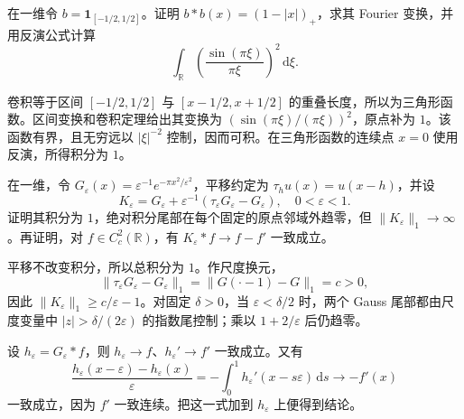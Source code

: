 \begin{exercise}\label{b2:ex:03-tent}
在一维令 \(b=\mathbf1_{[-1/2,1/2]}\)。证明 \(b*b(x)=(1-|x|)_+\)，求其 Fourier 变换，并用反演公式计算
\[
 \int_{\mathbb R}\left(\dfrac{\sin(\pi\xi)}{\pi\xi}\right)^2\,\mathrm{d}\xi.
\]
\end{exercise}
\begin{solution}
卷积等于区间 \([-1/2,1/2]\) 与 \([x-1/2,x+1/2]\) 的重叠长度，所以为三角形函数。区间变换和卷积定理给出其变换为 \((\sin(\pi\xi)/(\pi\xi))^2\)，原点补为 \(1\)。该函数有界，且无穷远以 \(|\xi|^{-2}\) 控制，因而可积。在三角形函数的连续点 \(x=0\) 使用反演，所得积分为 \(1\)。
\end{solution}

\begin{optionalexercise}\label{b2:ex:03-signed-kernel}
在一维，令 \(G_\varepsilon(x)=\varepsilon^{-1}e^{-\pi x^2/\varepsilon^2}\)，平移约定为 \(\tau_hu(x)=u(x-h)\)，并设
\[
 K_\varepsilon=G_\varepsilon+\varepsilon^{-1}(\tau_\varepsilon G_\varepsilon-G_\varepsilon),
 \quad0<\varepsilon<1.
\]
证明其积分为 \(1\)，绝对积分尾部在每个固定的原点邻域外趋零，但 \(\|K_\varepsilon\|_1\to\infty\)。再证明，对 \(f\in C_c^2(\mathbb R)\)，有 \(K_\varepsilon*f\to f-f'\) 一致成立。
\end{optionalexercise}
\begin{solution}
平移不改变积分，所以总积分为 \(1\)。作尺度换元，
\[
 \|\tau_\varepsilon G_\varepsilon-G_\varepsilon\|_1
 =\|G(\cdot-1)-G\|_1=c>0,
\]
因此 \(\|K_\varepsilon\|_1\geq c/\varepsilon-1\)。对固定 \(\delta>0\)，当 \(\varepsilon<\delta/2\) 时，两个 Gauss 尾部都由尺度变量中 \(|z|>\delta/(2\varepsilon)\) 的指数尾控制；乘以 \(1+2/\varepsilon\) 后仍趋零。

设 \(h_\varepsilon=G_\varepsilon*f\)，则 \(h_\varepsilon\to f\)、\(h_\varepsilon'\to f'\) 一致成立。又有
\[
 \dfrac{h_\varepsilon(x-\varepsilon)-h_\varepsilon(x)}{\varepsilon}
 =-\int_0^1h_\varepsilon'(x-s\varepsilon)\,\mathrm{d}s\longrightarrow-f'(x)
\]
一致成立，因为 \(f'\) 一致连续。把这一式加到 \(h_\varepsilon\) 上便得到结论。
\end{solution}

